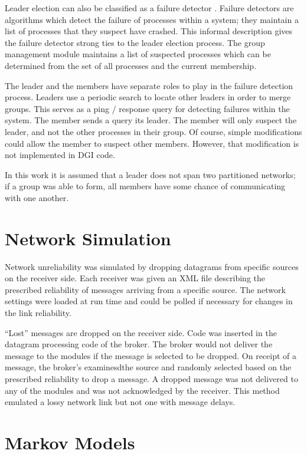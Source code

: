 Leader election can also be classified as a failure detector \cite{LEADERELECTIONEVAL}.
Failure detectors are algorithms which detect the failure of processes within a system; they maintain a list of processes that they suspect have crashed.
This informal description gives the failure detector strong ties to the leader election process. 
The group management module maintains a list of suspected processes which can be determined from the set of all processes and the current membership.

The leader and the members have separate roles to play in the failure detection process.
Leaders use a periodic search to locate other leaders in order to merge groups.
This serves as a ping / response query for detecting failures within the system.
The member sends a query its leader.
The member will only suspect the leader, and not the other processes in their group.
Of course, simple modifications could allow the member to suspect other members.
However, that modification is not implemented in DGI code.

In this work it is assumed that a leader does not span two partitioned networks; if a group was able to form, all members have some chance of communicating with one another.

\section{Network Simulation}

Network unreliability was simulated by dropping datagrams from specific sources on the receiver side.
Each receiver was given an XML file describing the prescribed reliability of messages arriving from a specific source.
The network settings were loaded at run time and could be polled if necessary for changes in the link reliability.

``Lost'' messages are dropped on the receiver side. 
Code was inserted in the datagram processing code of the broker.
The broker would not deliver the message to the modules if the message is selected to be dropped.
On receipt of a message, the broker's examinesdthe source and randomly selected based on the prescribed reliability to drop a message.
A dropped message was not delivered to any of the modules and was not acknowledged by the receiver.
This method emulated a lossy network link but not one with message delays.

\section{Markov Models}

